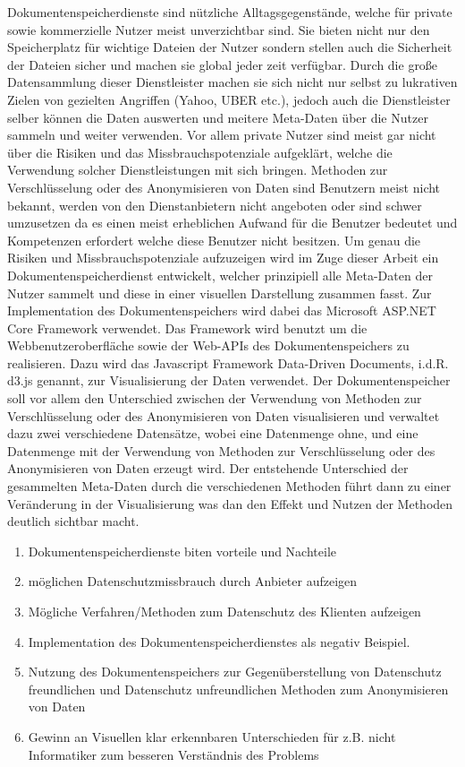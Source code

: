 \documentclass[
    fontsize=12pt,
    headings=small,
    parskip=half,           %
    bibliography=totoc,
    numbers=noenddot,       %
    open=any,               %
    ]{scrreprt}
\begin{document}
Dokumentenspeicherdienste sind nützliche Alltagsgegenstände, welche für private sowie kommerzielle Nutzer meist unverzichtbar sind. Sie bieten nicht nur den Speicherplatz für wichtige Dateien der Nutzer sondern stellen auch die Sicherheit der Dateien sicher und machen sie global jeder zeit verfügbar. Durch die große Datensammlung dieser Dienstleister machen sie sich nicht nur selbst zu lukrativen Zielen von gezielten Angriffen (Yahoo, UBER etc.), jedoch auch die Dienstleister selber können die Daten auswerten und meitere Meta-Daten über die Nutzer sammeln und weiter verwenden. Vor allem private Nutzer sind meist gar nicht über die Risiken und das Missbrauchspotenziale aufgeklärt, welche die Verwendung solcher Dienstleistungen mit sich bringen. Methoden zur Verschlüsselung oder des Anonymisieren von Daten sind Benutzern meist nicht bekannt, werden von den Dienstanbietern nicht angeboten oder sind schwer umzusetzen da es einen meist erheblichen Aufwand für die Benutzer bedeutet und Kompetenzen erfordert welche diese Benutzer nicht besitzen. Um genau die Risiken und Missbrauchspotenziale aufzuzeigen wird im Zuge dieser Arbeit ein Dokumentenspeicherdienst entwickelt, welcher prinzipiell alle Meta-Daten der Nutzer sammelt und diese in einer visuellen Darstellung zusammen fasst. Zur Implementation des Dokumentenspeichers wird dabei das Microsoft ASP.NET Core Framework verwendet. Das Framework wird benutzt um die Webbenutzeroberfläche sowie der Web-APIs des Dokumentenspeichers zu realisieren. Dazu wird das Javascript Framework Data-Driven Documents, i.d.R. d3.js genannt, zur Visualisierung der Daten verwendet. Der Dokumentenspeicher soll vor allem den Unterschied zwischen der Verwendung von Methoden zur Verschlüsselung oder des Anonymisieren von Daten visualisieren und verwaltet dazu zwei verschiedene Datensätze, wobei eine Datenmenge ohne, und eine Datenmenge mit der Verwendung von Methoden zur Verschlüsselung oder des Anonymisieren von Daten erzeugt wird. Der entstehende Unterschied der gesammelten Meta-Daten durch die verschiedenen Methoden führt dann zu einer Veränderung in der Visualisierung was dan den Effekt und Nutzen der Methoden deutlich sichtbar macht.  

\begin{enumerate}
\item Dokumentenspeicherdienste biten vorteile und Nachteile 
\item möglichen Datenschutzmissbrauch durch Anbieter aufzeigen
\item Mögliche Verfahren/Methoden zum Datenschutz des Klienten aufzeigen
\item Implementation des Dokumentenspeicherdienstes als negativ Beispiel.
\item Nutzung des Dokumentenspeichers zur Gegenüberstellung von Datenschutz freundlichen und Datenschutz unfreundlichen Methoden zum Anonymisieren von Daten
\item Gewinn an Visuellen klar erkennbaren Unterschieden für z.B. nicht Informatiker zum besseren Verständnis des Problems
\end{enumerate}
\end{document}
